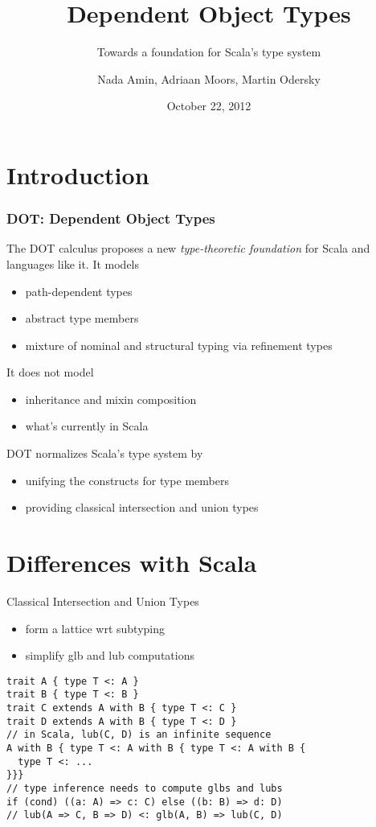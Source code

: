 \documentclass{beamer}
\title{Dependent Object Types}
\subtitle{Towards a foundation for Scala's type system}
\author{Nada Amin, Adriaan Moors, Martin Odersky}
\institute{FOOL 2012}
\date{October 22, 2012}
\begin{document}
\frame{\titlepage}

\section{Introduction}

\begin{frame}
\frametitle{DOT: Dependent Object Types}

The DOT calculus proposes a new \emph{type-theoretic foundation} for Scala
and languages like it. It models
\begin{itemize}
\item path-dependent types
\item abstract type members
\item mixture of nominal and structural typing via refinement types
\end{itemize}

It does not model
\begin{itemize}
\item inheritance and mixin composition
\item what's currently in Scala
\end{itemize}

DOT normalizes Scala's type system by
\begin{itemize}
\item unifying the constructs for type members
\item providing classical intersection and union types
\end{itemize}

\end{frame}

\section{Differences with Scala}

\begin{frame}[fragile]{Classical Intersection and Union Types}
\begin{itemize}
\item form a lattice wrt subtyping
\item simplify glb and lub computations
\end{itemize}
\begin{verbatim}
trait A { type T <: A }
trait B { type T <: B }
trait C extends A with B { type T <: C }
trait D extends A with B { type T <: D }
// in Scala, lub(C, D) is an infinite sequence
A with B { type T <: A with B { type T <: A with B {
  type T <: ...
}}}
// type inference needs to compute glbs and lubs
if (cond) ((a: A) => c: C) else ((b: B) => d: D)
// lub(A => C, B => D) <: glb(A, B) => lub(C, D)
\end{verbatim}
\end{frame}
\end{document}
